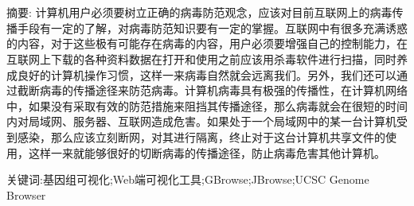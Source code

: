 \chapter*{\LARGE \heiti \cnthtopic}

\vspace{1em}
{\normalsize \heiti 摘要: }{\small \songti 
		计算机用户必须要树立正确的病毒防范观念，应该对目前互联网上的病毒传播手段有一定的了解，对病毒防范知识要有一定的掌握。互联网中有很多充满诱惑的内容，对于这些极有可能存在病毒的内容，用户必须要增强自己的控制能力，在互联网上下载的各种资料数据在打开和使用之前应该用杀毒软件进行扫描，同时养成良好的计算机操作习惯，这样一来病毒自然就会远离我们。另外，我们还可以通过截断病毒的传播途径来防范病毒。计算机病毒具有极强的传播性，在计算机网络中，如果没有采取有效的防范措施来阻挡其传播途径，那么病毒就会在很短的时间内对局域网、服务器、互联网造成危害。如果处于一个局域网中的某一台计算机受到感染，那么应该立刻断网，对其进行隔离，终止对于这台计算机共享文件的使用，这样一来就能够很好的切断病毒的传播途径，防止病毒危害其他计算机。
}

{\normalsize \heiti 关键词:}{\small 基因组可视化;Web端可视化工具;GBrowse;JBrowse;UCSC Genome Browser}
\thispagestyle{empty}